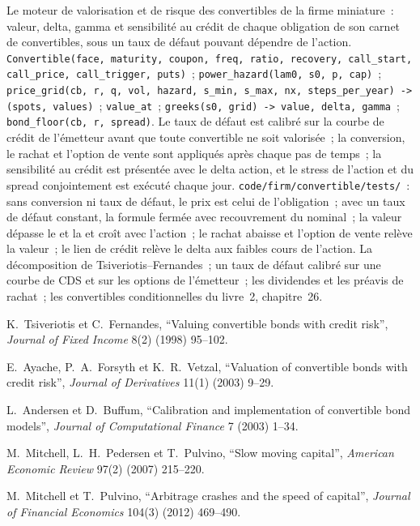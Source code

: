 \begin{build}
 Le moteur de valorisation et de risque des convertibles de la firme miniature~: valeur, delta, gamma et sensibilité au crédit de chaque obligation de son
carnet de convertibles, sous un taux de défaut pouvant dépendre de l'action.
 \texttt{Convertible(face, maturity, coupon, freq, ratio, recovery, call\_start, call\_price, call\_trigger, puts)}~;
\texttt{power\_hazard(lam0, s0, p, cap)}~; \texttt{price\_grid(cb, r, q, vol, hazard, s\_min, s\_max, nx, steps\_per\_year) -> (spots, values)}~;
\texttt{value\_at}~; \texttt{greeks(s0, grid) -> value, delta, gamma}~; \texttt{bond\_floor(cb, r, spread)}.
 Le taux de défaut est calibré sur la courbe de crédit de l'émetteur avant que toute convertible ne soit valorisée~; la conversion, le rachat et l'option de vente sont appliqués
après chaque pas de temps~; la sensibilité au crédit est présentée avec le delta action, et le stress de l'action et du spread conjointement est exécuté chaque jour.
 \texttt{code/firm/convertible/tests/}~: sans conversion ni taux de défaut, le prix est celui de l'obligation~; avec un taux de défaut constant, la
formule fermée avec recouvrement du nominal~; la valeur dépasse le  et la  et croît avec l'action~; le rachat abaisse et l'option de vente relève la valeur~; le
lien de crédit relève le delta aux faibles cours de l'action.
 La décomposition de Tsiveriotis--Fernandes~; un taux de défaut calibré sur une courbe de CDS et sur les options de l'émetteur~; les dividendes et les préavis
de rachat~; les convertibles conditionnelles du livre~2, chapitre~26.
\end{build}

\begin{omsources}
\item K.~Tsiveriotis et C.~Fernandes, ``Valuing convertible bonds with credit risk'', \emph{Journal of Fixed Income} 8(2) (1998) 95--102.
\item E.~Ayache, P.~A.~Forsyth et K.~R.~Vetzal, ``Valuation of convertible bonds with credit risk'', \emph{Journal of Derivatives} 11(1) (2003)
9--29.
\item L.~Andersen et D.~Buffum, ``Calibration and implementation of convertible bond models'', \emph{Journal of Computational Finance} 7 (2003)
1--34.
\item M.~Mitchell, L.~H.~Pedersen et T.~Pulvino, ``Slow moving capital'', \emph{American Economic Review} 97(2) (2007) 215--220.
\item M.~Mitchell et T.~Pulvino, ``Arbitrage crashes and the speed of capital'', \emph{Journal of Financial Economics} 104(3) (2012) 469--490.
\end{omsources}

